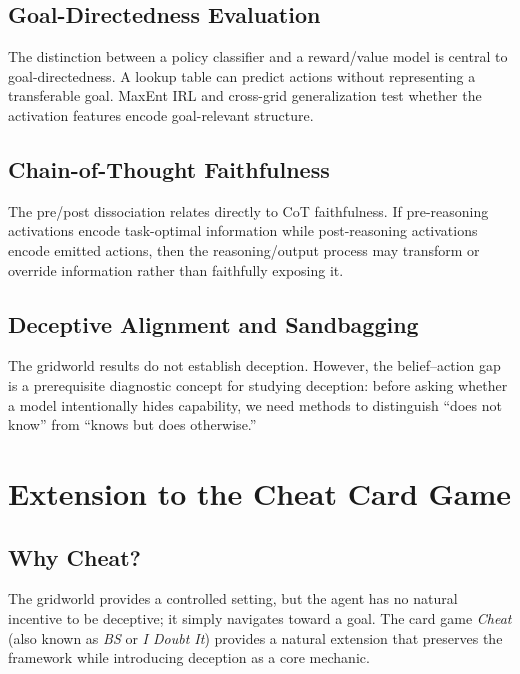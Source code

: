 \documentclass[11pt,a4paper]{article}
\begin{document}
\subsection{Goal-Directedness Evaluation}

The distinction between a policy classifier and a reward/value model is central to goal-directedness. A lookup table can predict actions without representing a transferable goal. MaxEnt IRL and cross-grid generalization test whether the activation features encode goal-relevant structure.

\subsection{Chain-of-Thought Faithfulness}

The pre/post dissociation relates directly to CoT faithfulness. If pre-reasoning activations encode task-optimal information while post-reasoning activations encode emitted actions, then the reasoning/output process may transform or override information rather than faithfully exposing it.

\subsection{Deceptive Alignment and Sandbagging}

The gridworld results do not establish deception. However, the belief--action gap is a prerequisite diagnostic concept for studying deception: before asking whether a model intentionally hides capability, we need methods to distinguish ``does not know'' from ``knows but does otherwise.''

\section{Extension to the Cheat Card Game}

\subsection{Why Cheat?}

The gridworld provides a controlled setting, but the agent has no natural incentive to be deceptive; it simply navigates toward a goal. The card game \textit{Cheat} (also known as \textit{BS} or \textit{I Doubt It}) provides a natural extension that preserves the framework while introducing deception as a core mechanic.
\end{document}
